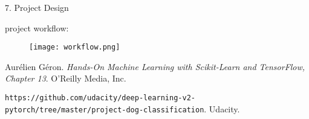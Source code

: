 \documentclass{article}
\begin{document}
7. Project Design

project workflow: 

\begin{figure}[hbt!]
\texttt{[image: workflow.png]}
\end{figure}

\begin{thebibliography}{9}
Aurélien Géron. 
\textit{Hands-On Machine Learning with Scikit-Learn and TensorFlow, Chapter 13}. 
O’Reilly Media, Inc.

\texttt{https://github.com/udacity/deep-learning-v2-pytorch/tree/master/project-dog-classification}. 
Udacity.

\end{thebibliography}
\end{document}
